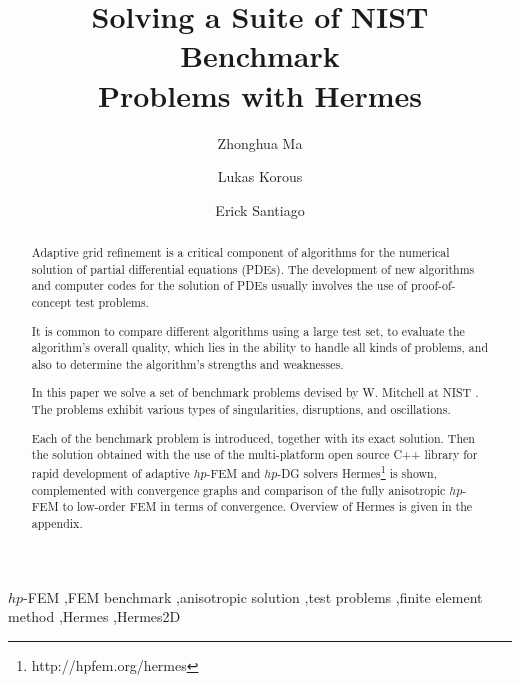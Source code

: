 \documentclass[12pt]{elsarticle}
\begin{document}
\begin{frontmatter}



\title{Solving a Suite of NIST Benchmark \\Problems with Hermes}

\author[label1]{Zhonghua Ma}
\author[label2]{Lukas Korous}
\author[label3]{Erick Santiago}
\address[label1]{China University of Petroleum, Beijing, China}
\address[label2]{Charles University, Prague, Czech Republic}
\address[label3]{University of Nevada, Reno, USA}

\begin{abstract}
Adaptive grid refinement is a critical component of algorithms for the numerical solution of partial differential equations (PDEs).
The development of new algorithms and computer
codes for the solution of PDEs usually involves the use of proof-of-concept test problems.

It is common to compare different algorithms using a large test set, to evaluate the algorithm's overall quality, which lies in the ability to handle all kinds of problems, and also to determine the algorithm's strengths and weaknesses.

In this paper we solve a set of benchmark problems devised by
W. Mitchell at NIST \cite{mitchell-1}.
The problems exhibit various types of singularities, disruptions, and oscillations.

Each of the benchmark problem is introduced, together with its exact solution.
Then the solution obtained with the use of the multi-platform open source
C++ library for rapid development of adaptive $hp$-FEM and $hp$-DG solvers {\sc Hermes}\footnote{http://hpfem.org/hermes} is shown,
complemented with convergence graphs and comparison of the fully anisotropic
$hp$-FEM to low-order FEM in terms of convergence.
Overview of Hermes is given in the appendix.
\end{abstract}

\begin{keyword}
$hp$-FEM \sep FEM benchmark \sep anisotropic solution \sep test problems \sep finite element method \sep Hermes \sep Hermes2D
\end{keyword}

\end{frontmatter}
\end{document}
